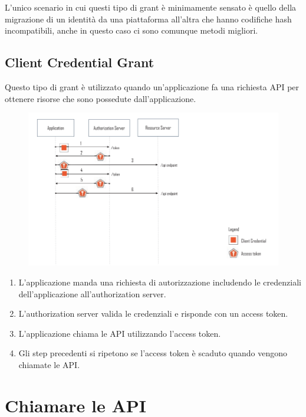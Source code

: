 L'unico scenario in cui questi tipo di grant è minimamente sensato è quello della
migrazione di un identità da una piattaforma all'altra che hanno codifiche hash
incompatibili, anche in questo caso ci sono comunque metodi migliori.

\subsection{Client Credential Grant}

Questo tipo di grant è utilizzato quando un'applicazione fa una richiesta API per
ottenere risorse che sono possedute dall'applicazione.

\begin{figure}[H]
      \centering
      \includegraphics[width=\textwidth, keepaspectratio]{capitoli/id_managing/imgs/clientgrant.png}
\end{figure}

\begin{enumerate}
      \item L'applicazione manda una richiesta di autorizzazione includendo le credenziali
            dell'applicazione all'authorization server.
      \item L'authorization server valida le credenziali e risponde con un access token.
      \item L'applicazione chiama le API utilizzando l'access token.
      \item Gli step precedenti si ripetono se l'access token è scaduto quando vengono chiamate
            le API.
\end{enumerate}

\section{Chiamare le API}

